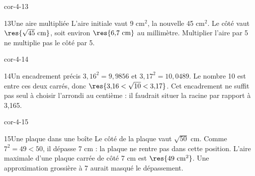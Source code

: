 \begin{blocLivre}{cor-4-13}\begin{corrige}{13}{Une aire multipliée}
L’aire initiale vaut 9 cm$^2$, la nouvelle 45 cm$^2$. Le côté vaut $\res{\sqrt{45}\ \mathrm{cm}}$, soit environ $\res{6{,}7\ \mathrm{cm}}$ au millimètre. Multiplier l’aire par 5 ne multiplie pas le côté par 5.
\label{fig-cor-4-13}
\end{corrige}\end{blocLivre}
\begin{blocLivre}{cor-4-14}\begin{corrige}{14}{Un encadrement précis}
$3{,}16^2=9{,}9856$ et $3{,}17^2=10{,}0489$. Le nombre 10 est entre ces deux carrés, donc $\res{3{,}16<\sqrt{10}<3{,}17}$. Cet encadrement ne suffit pas seul à choisir l’arrondi au centième : il faudrait situer la racine par rapport à 3,165.
\end{corrige}\end{blocLivre}
\begin{blocLivre}{cor-4-15}\begin{corrige}{15}{Une plaque dans une boîte}
Le côté de la plaque vaut $\sqrt{50}$ cm. Comme $7^2=49<50$, il dépasse 7 cm : la plaque ne rentre pas dans cette position. L’aire maximale d’une plaque carrée de côté 7 cm est $\res{49\ \mathrm{cm}^2}$. Une approximation grossière à 7 aurait masqué le dépassement.
\label{fig-cor-4-15}
\end{corrige}\end{blocLivre}

